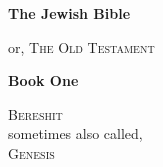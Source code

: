 \documentclass[a4paper,11pt]{report}
\begin{document}
\begin{titlepage}
    \begin{center}
        \vspace*{1cm}
 
        {\Huge  \textbf{The Jewish Bible}}
 
        \vspace{0.5cm}
        {or, \textsc{The Old Testament}}
        
                   
        \vspace{1.5cm}
        
        {\textbf{Book One}}

        \vspace{1.5cm}

        \vspace{0.5cm}
        {\textsc{Bereshit}\\
        sometimes also called,\\
        \textsc{Genesis}}

        \vspace{0.5cm}

        \vfill
    \end{center}
 \end{titlepage}

\tableofcontents


\end{document}
